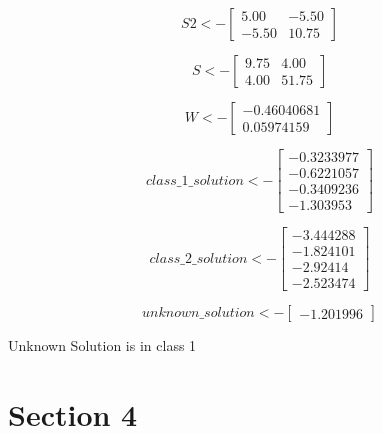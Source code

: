\documentclass{report}
\begin{document}
\[
  S2 <- 
  \begin{bmatrix}
    5.00 & -5.50 \\
    -5.50 & 10.75
  \end{bmatrix}
\]

\[
  S <- 
  \begin{bmatrix}
    9.75 & 4.00 \\
    4.00 & 51.75
  \end{bmatrix}
\]

\[
  W <- 
  \begin{bmatrix}
    -0.46040681 \\
    0.05974159
  \end{bmatrix}
\]

\[
  class\_1\_solution <- 
  \begin{bmatrix}
    -0.3233977 \\
    -0.6221057 \\
    -0.3409236 \\
    -1.303953
  \end{bmatrix}
\]

\[
  class\_2\_solution <- 
  \begin{bmatrix}
    -3.444288 \\
    -1.824101 \\
    -2.92414 \\
    -2.523474
  \end{bmatrix}
\]

\[
  unknown\_solution <- 
  \begin{bmatrix}
    -1.201996
  \end{bmatrix}
\]

Unknown Solution is in class 1
  

\chapter{Section 4}
\end{document}
